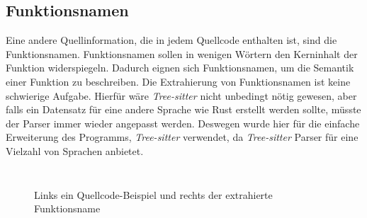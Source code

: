 \documentclass[12pt,letterpaper,ngerman]{article}
\begin{document}
\subsection{Funktionsnamen}
Eine andere Quellinformation, die in jedem Quellcode enthalten ist,
sind die Funktionsnamen. Funktionsnamen sollen in wenigen Wörtern 
den Kerninhalt der Funktion widerspiegeln. Dadurch eignen sich 
Funktionsnamen, um die Semantik einer Funktion zu beschreiben. 
Die Extrahierung von Funktionsnamen ist keine schwierige Aufgabe.
Hierfür wäre \textit{Tree-sitter} nicht unbedingt nötig gewesen, 
aber falls ein 
Datensatz für eine andere Sprache wie Rust erstellt werden sollte,
müsste der Parser immer wieder angepasst werden.
Deswegen wurde hier für die einfache Erweiterung des Programms,
\textit{Tree-sitter} verwendet, da \textit{Tree-sitter} Parser für 
eine Vielzahl von Sprachen anbietet.
%
\begin{figure}
  \begin{center}
    \begin{minipage}[c]{6cm}
        \centering
        \inputminted[fontsize=\scriptsize]{c}{comments.c}
    \end{minipage}
    \hspace{0.1cm}
    \begin{minipage}[c]{6cm}
        \centering
        \inputminted[fontsize=\scriptsize]{json}{names.json}
    \end{minipage}
  \end{center}
  \caption{Links ein Quellcode-Beispiel und rechts der extrahierte Funktionsname}
\end{figure}

\hfill\\
\pagebreak
\hfill\\
\end{document}
